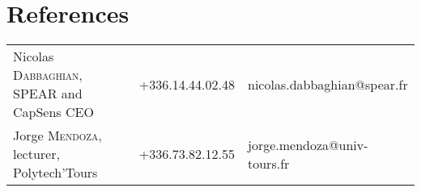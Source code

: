 \documentclass[11pt,a4paper]{moderncv}
\begin{document}
\section{References}
\begin{tabular}{ p{}
                 p{}
                 p{} }
  \hspace{0.7em} Nicolas \textsc{Dabbaghian}, \scriptsize{SPEAR and CapSens CEO} & +336.14.44.02.48 & nicolas.dabbaghian@spear.fr \\
  \hspace{0.7em} Jorge \textsc{Mendoza}, \scriptsize{lecturer, Polytech'Tours} & +336.73.82.12.55 & jorge.mendoza@univ-tours.fr \\
\end{tabular}
\end{document}
